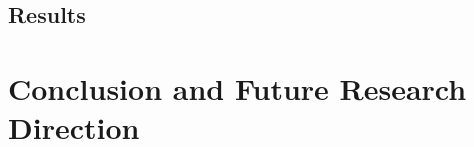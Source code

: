 \documentclass[12pt]{report}
\begin{document}
\section{Results}
\chapter{Conclusion and Future Research Direction}


\begin{singlespace}


\end{singlespace}
\end{document}
